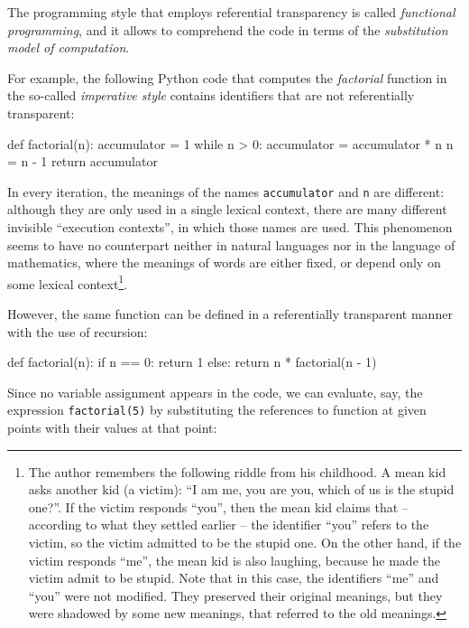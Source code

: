 The programming style that employs referential transparency
is called \emph{functional programming}, and it allows to
comprehend the code in terms of the \emph{substitution model
  of computation}\cite{SICP}.

For example, the following Python code that computes the \emph{factorial}
function in the so-called \emph{imperative style} contains identifiers
that are not referentially transparent:

\begin{Snippet}
  def factorial(n):
      accumulator = 1 
      while n > 0:
          accumulator = accumulator * n
          n = n - 1
      return accumulator
\end{Snippet}

In every iteration, the meanings of the names \texttt{accumulator}
and \texttt{n} are different: although they are only used in a single
lexical context, there are many different invisible ``execution contexts'',
in which those names are used. This phenomenon seems to have no counterpart
neither in natural languages nor in the language of mathematics, where
the meanings of words are either fixed, or depend only on some lexical
context\footnote{The author remembers the following riddle from his
  childhood. A mean kid asks another kid (a victim): ``I am me, you are you,
  which of us is the stupid one?''. If the victim responds ``you'', then
  the mean kid claims that -- according to what they settled earlier -- the
  identifier ``you'' refers to the victim, so the victim admitted to
  be the stupid one. On the other hand, if the victim responds ``me'',
  the mean kid is also laughing, because he made the victim admit to
  be stupid.
  Note that in this case, the identifiers ``me'' and ``you'' were
  not modified. They preserved their original meanings, but they were
  shadowed by some new meanings, that referred to the old meanings.
}.

However, the same function can be defined in a referentially transparent
manner with the use of recursion:

\begin{Snippet}
  def factorial(n):
      if n == 0:
          return 1
      else:
          return n * factorial(n - 1)
\end{Snippet}

Since no variable assignment appears in the code, we can evaluate, say,
the expression \texttt{factorial(5)} by substituting the references
to function at given points with their values at that point:


